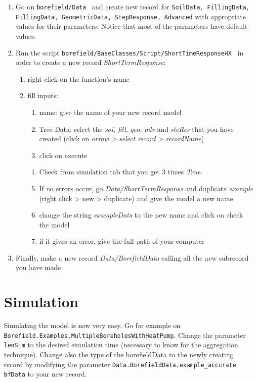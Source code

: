 \documentclass[a4paper,oneside,11pt]{report}
\begin{document}
\begin{enumerate}
\item Go on {\tt borefield/Data } and create new record for {\tt SoilData, FillingData, FillingData, GeometricData, StepResponse, Advanced} with appropriate values for their parameters. Notice that most of the parameters have default values.
\item Run the script {\tt borefield/BaseClasses/Script/ShortTimeResponseHX } in order to create a new record \textit{ShortTermResponse}:
	\begin{enumerate}
	\item right click on the function's name
	\item fill inputs:
		\begin{enumerate}
		\item name: give the name of your new record model
		\item Tree Data: select the \textit{soi, fill, geo, adv} and \textit{steRes} that you have created (click on \textit{arrow > select record > recordName})
		\item click on execute
		\item Check from simulation tab that you get 3 times \textit{True}. 
		\item If no errors occur, go \textit{Data/ShortTermResponse} and duplicate \textit{example} (right click > new > duplicate) and give the model a new name
		\item change the string \textit{exampleData} to the new name and click on check the model
		\item if it gives an error, give the full path of your computer
		\end{enumerate}
	\end{enumerate}
\item Finally, make a new record \textit{Data/BorefieldData} calling all the new subrecord you have made
\end{enumerate}


\section{Simulation}
Simulating the model is now very easy. Go for example on {\tt Borefield.Examples.MultipleBoreholesWithHeatPump}. Change the parameter {\tt lenSim} to the desired simulation time (necessary to know for the aggregation technique). Change also the type of the borefieldData to the newly creating record by modifying the parameter {\tt Data.BorefieldData.example\_accurate bfData} to your new record.
\end{document}
